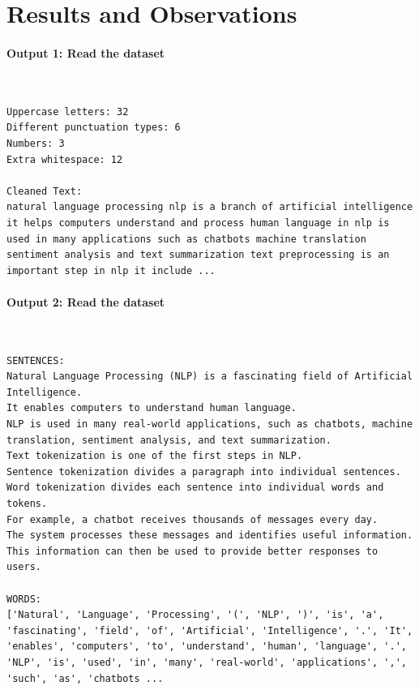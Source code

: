 \documentclass[12pt,a4paper,oneside]{report}
\begin{document}
\section{Results and Observations}
\paragraph{Output 1: Read the dataset}\mbox{}\\[-1ex]
\begin{Verbatim}[commandchars=\\\{\},breaklines=true,breakanywhere=true,fontsize=\scriptsize,frame=leftline,framesep=2mm,rulecolor=\color{gray}]
Uppercase letters: 32
Different punctuation types: 6
Numbers: 3
Extra whitespace: 12

Cleaned Text:
natural language processing nlp is a branch of artificial intelligence it helps computers understand and process human language in nlp is used in many applications such as chatbots machine translation sentiment analysis and text summarization text preprocessing is an important step in nlp it include ...
\end{Verbatim}
\paragraph{Output 2: Read the dataset}\mbox{}\\[-1ex]
\begin{Verbatim}[commandchars=\\\{\},breaklines=true,breakanywhere=true,fontsize=\scriptsize,frame=leftline,framesep=2mm,rulecolor=\color{gray}]
SENTENCES:
Natural Language Processing (NLP) is a fascinating field of Artificial Intelligence.
It enables computers to understand human language.
NLP is used in many real-world applications, such as chatbots, machine translation, sentiment analysis, and text summarization.
Text tokenization is one of the first steps in NLP.
Sentence tokenization divides a paragraph into individual sentences.
Word tokenization divides each sentence into individual words and tokens.
For example, a chatbot receives thousands of messages every day.
The system processes these messages and identifies useful information.
This information can then be used to provide better responses to users.

WORDS:
['Natural', 'Language', 'Processing', '(', 'NLP', ')', 'is', 'a', 'fascinating', 'field', 'of', 'Artificial', 'Intelligence', '.', 'It', 'enables', 'computers', 'to', 'understand', 'human', 'language', '.', 'NLP', 'is', 'used', 'in', 'many', 'real-world', 'applications', ',', 'such', 'as', 'chatbots ...
\end{Verbatim}
\end{document}
